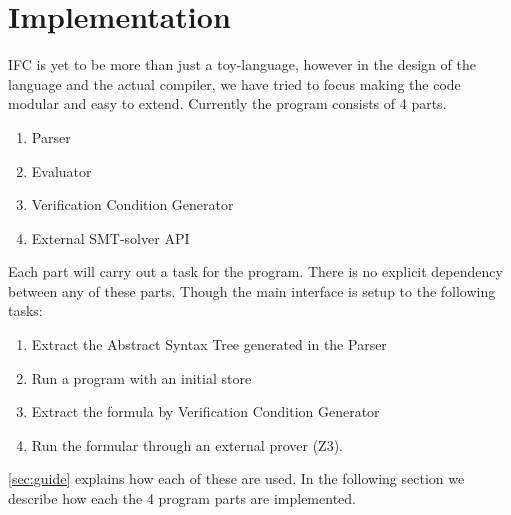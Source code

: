 \section{Implementation}\label{sec:implementation}
IFC is yet to be more than just a toy-language, however in the design of the language and the actual compiler, we have tried to focus making the code modular and easy to extend.
Currently the program consists of 4 parts.
\begin{enumerate}
  \item Parser
  \item Evaluator
  \item Verification Condition Generator
  \item External SMT-solver API
\end{enumerate}
Each part will carry out a task for the program. There is no explicit dependency between any of these parts. Though the main interface is setup to the following tasks:
\begin{enumerate}
  \item Extract the Abstract Syntax Tree generated in the Parser
  \item Run a program with an initial store
  \item Extract the formula by Verification Condition Generator
  \item Run the formular through an external prover (Z3).
\end{enumerate}
\autoref{sec:guide} explains how each of these are used. In the following section we describe how each the 4 program parts are implemented.










